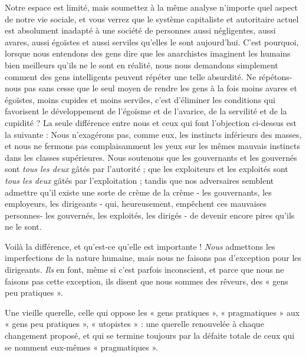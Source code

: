 Notre espace est limité, mais soumettez à la même analyse n'importe quel aspect de notre vie sociale, et vous verrez que le système capitaliste et autoritaire actuel est absolument inadapté à une société de personnes aussi négligentes, aussi avares, aussi égoïstes et aussi serviles qu'elles le sont aujourd'hui. C'est pourquoi, lorsque nous entendons des gens dire que les anarchistes imaginent les humains bien meilleurs qu'ils ne le sont en réalité, nous nous demandons simplement comment des gens intelligents peuvent répéter une telle absurdité. Ne répétons-nous pas sans cesse que le seul moyen de rendre les gens à la fois moins avares et égoïstes, moins cupides et moins serviles, c'est d'éliminer les conditions qui favorisent le développement de l'égoïsme et de l’avarice, de la servilité et de la cupidité ? La seule différence entre nous et ceux qui font l'objection ci-dessus est la suivante : Nous n'exagérons pas, comme eux, les instincts inférieurs des masses, et nous ne fermons pas complaisamment les yeux sur les mêmes mauvais instincts dans les classes supérieures. Nous soutenons que les gouvernants et les gouvernés sont \emph{tous les deux} gâtés par l'autorité ; que les exploiteurs et les exploités sont \emph{tous les deux} gâtés par l'exploitation ; tandis que nos adversaires semblent admettre qu'il existe une sorte de crème de la crème - les gouvernants, les employeurs, les dirigeants - qui, heureusement, empêchent ces mauvaises personnes- les gouvernés, les exploités, les dirigés - de devenir encore pires qu'ils ne le sont.

Voilà la différence, et qu’est-ce qu’elle est importante ! \emph{Nous} admettons les imperfections de la nature humaine, mais nous ne faisons pas d'exception pour les dirigeants. \emph{Ils} en font, même si c'est parfois inconscient, et parce que nous ne faisons pas cette exception, ils disent que nous sommes des rêveurs, des « gens peu pratiques ».

Une vieille querelle, celle qui oppose les « gens pratiques », « pragmatiques » aux « gens peu pratiques », « utopistes » : une querelle renouvelée à chaque changement proposé, et qui se termine toujours par la défaite totale de ceux qui se nomment eux-mêmes « pragmatiques ».

